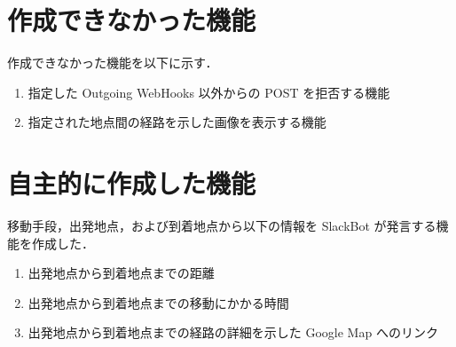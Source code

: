 \documentclass[12pt]{jsarticle}
\begin{document}
\section{作成できなかった機能}
作成できなかった機能を以下に示す．
\begin{enumerate}
\item 指定した Outgoing WebHooks 以外からの POST を拒否する機能
\item 指定された地点間の経路を示した画像を表示する機能
\end{enumerate}

\section{自主的に作成した機能}
移動手段，出発地点，および到着地点から以下の情報を SlackBot が発言する機能を作成した．
\begin{enumerate}
\item 出発地点から到着地点までの距離
\item 出発地点から到着地点までの移動にかかる時間
\item 出発地点から到着地点までの経路の詳細を示した Google Map へのリンク
\end{enumerate}




\end{document}
